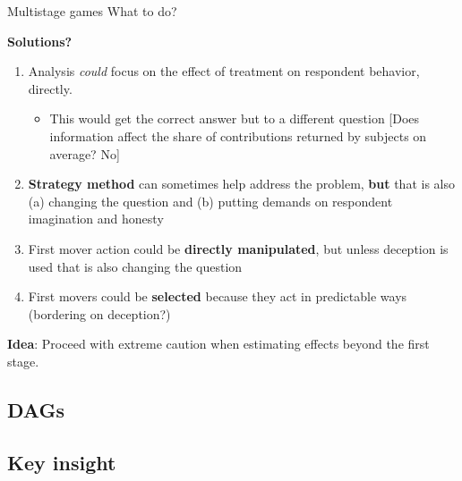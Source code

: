 \documentclass[
  11pt,
  ignorenonframetext,
]{beamer}
\providecommand{\tightlist}{%
  \setlength{\itemsep}{0pt}\setlength{\parskip}{0pt}}\usepackage{longtable,booktabs,array}
\begin{document}
\begin{frame}{Multistage games}
\protect\hypertarget{multistage-games-5}{}
What to do?

\textbf{Solutions?}

\begin{enumerate}
\tightlist
\item
  Analysis \emph{could} focus on the effect of treatment on respondent
  behavior, directly.

  \begin{itemize}
  \tightlist
  \item
    This would get the correct answer but to a different question
    {[}Does information affect the share of contributions returned by
    subjects on average? No{]}
  \end{itemize}
\item
  \textbf{Strategy method} can sometimes help address the problem,
  \textbf{but} that is also (a) changing the question and (b) putting
  demands on respondent imagination and honesty
\item
  First mover action could be \textbf{directly manipulated}, but unless
  deception is used that is also changing the question
\item
  First movers could be \textbf{selected} because they act in
  predictable ways (bordering on deception?)
\end{enumerate}

\textbf{Idea}: Proceed with extreme caution when estimating effects
beyond the first stage.
\end{frame}

\hypertarget{dags}{%
\subsection{DAGs}\label{dags}}

\hypertarget{key-insight}{%
\subsection{Key insight}\label{key-insight}}
\end{document}
